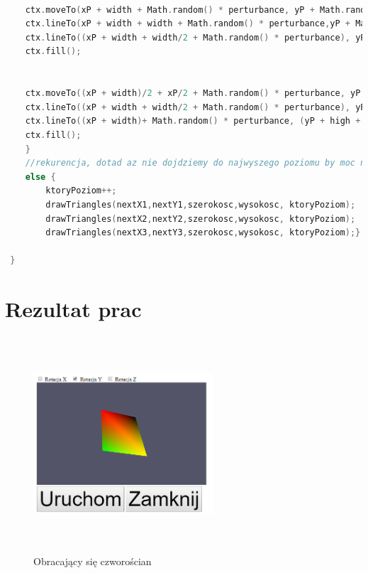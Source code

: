 \documentclass[polish,polish,a4paper]{article}
\begin{document}
{\begin{lstlisting}[language=C++]
	
	ctx.moveTo(xP + width + Math.random() * perturbance, yP + Math.random() * perturbance);		
    ctx.lineTo(xP + width + width + Math.random() * perturbance,yP + Math.random() * perturbance); //						
    ctx.lineTo((xP + width + width/2 + Math.random() * perturbance), yP + high + Math.random() * perturbance)//							   
	ctx.fill();
   
	
	ctx.moveTo((xP + width)/2 + xP/2 + Math.random() * perturbance, yP + high + Math.random() * perturbance);
    ctx.lineTo((xP + width + width/2 + Math.random() * perturbance), yP + high + Math.random() * perturbance)						   
    ctx.lineTo((xP + width)+ Math.random() * perturbance, (yP + high + high)+ Math.random() * perturbance)      //	
	ctx.fill();
	}
	//rekurencja, dotad az nie dojdziemy do najwyszego poziomu by moc narysowac figury
	else {
		ktoryPoziom++;
		drawTriangles(nextX1,nextY1,szerokosc,wysokosc, ktoryPoziom);
		drawTriangles(nextX2,nextY2,szerokosc,wysokosc, ktoryPoziom);
		drawTriangles(nextX3,nextY3,szerokosc,wysokosc, ktoryPoziom);}
	
 }

\end{lstlisting}
}




  \section{Rezultat prac}

    \begin{figure}[h!]
      \centering
      \includegraphics[width=0.6\textwidth,height=8cm]{czworoscian.png}
      \caption{Obracający się czworościan}
      \label{fig:zrzut1}
    \end{figure}
\end{document}
